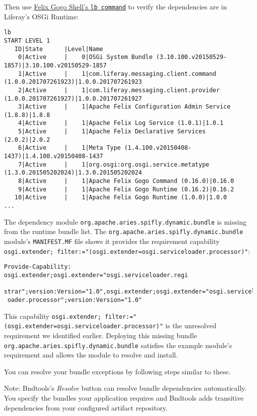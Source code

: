 Then use
\href{/docs/7-2/customization/-/knowledge_base/c/using-the-felix-gogo-shell}{Felix
Gogo Shell's \texttt{lb\ command}} to verify the dependencies are in
Liferay's OSGi Runtime:

\begin{verbatim}
lb
START LEVEL 1
   ID|State      |Level|Name
    0|Active     |    0|OSGi System Bundle (3.10.100.v20150529-1857)|3.10.100.v20150529-1857
    1|Active     |    1|com.liferay.messaging.client.command (1.0.0.201707261923)|1.0.0.201707261923
    2|Active     |    1|com.liferay.messaging.client.provider (1.0.0.201707261927)|1.0.0.201707261927
    3|Active     |    1|Apache Felix Configuration Admin Service (1.8.8)|1.8.8
    4|Active     |    1|Apache Felix Log Service (1.0.1)|1.0.1
    5|Active     |    1|Apache Felix Declarative Services (2.0.2)|2.0.2
    6|Active     |    1|Meta Type (1.4.100.v20150408-1437)|1.4.100.v20150408-1437
    7|Active     |    1|org.osgi:org.osgi.service.metatype (1.3.0.201505202024)|1.3.0.201505202024
    8|Active     |    1|Apache Felix Gogo Command (0.16.0)|0.16.0
    9|Active     |    1|Apache Felix Gogo Runtime (0.16.2)|0.16.2
   10|Active     |    1|Apache Felix Gogo Runtime (1.0.0)|1.0.0
...
\end{verbatim}

The dependency module \texttt{org.apache.aries.spifly.dynamic.bundle} is
missing from the runtime bundle list. The
\texttt{org.apache.aries.spifly.dynamic.bundle} module's
\texttt{MANIFEST.MF} file shows it provides the requirement capability
\texttt{osgi.extender;\ filter:="(osgi.extender=osgi.serviceloader.processor)"}:

\begin{verbatim}
Provide-Capability: osgi.extender;osgi.extender="osgi.serviceloader.regi
 strar";version:Version="1.0",osgi.extender;osgi.extender="osgi.servicel
 oader.processor";version:Version="1.0"
\end{verbatim}

This capability
\texttt{osgi.extender;\ filter:="(osgi.extender=osgi.serviceloader.processor)"}
is the unresolved requirement we identified earlier. Deploying this
missing bundle \texttt{org.apache.aries.spifly.dynamic.bundle} satisfies
the example module's requirement and allows the module to resolve and
install.

You can resolve your bundle exceptions by following steps similar to
these.

\noindent\hrulefill

Note: Bndtools's \emph{Resolve} button can resolve bundle dependencies
automatically. You specify the bundles your application requires and
Bndtools adds transitive dependencies from your configured artifact
repository.

